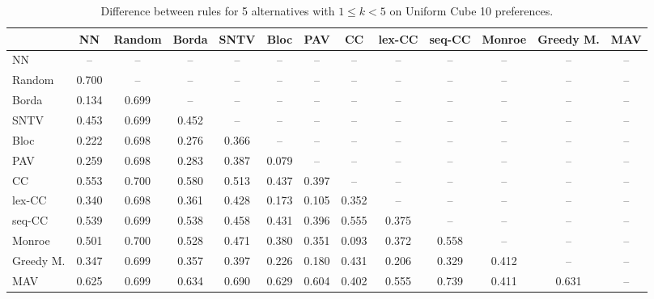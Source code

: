 
\begin{table*}[htbp]
\centering
\begin{tabular}{lcccccccccccc}
\toprule
 & NN & Random & Borda & SNTV & Bloc & PAV & CC & lex-CC & seq-CC & Monroe & Greedy M. & MAV \\
\midrule
NN & -- & -- & -- & -- & -- & -- & -- & -- & -- & -- & -- & -- \\
Random & \cellcolor{blue!70} 0.700 & -- & -- & -- & -- & -- & -- & -- & -- & -- & -- & -- \\
Borda & \cellcolor{blue!13} 0.134 & \cellcolor{blue!69} 0.699 & -- & -- & -- & -- & -- & -- & -- & -- & -- & -- \\
SNTV & \cellcolor{blue!45} 0.453 & \cellcolor{blue!69} 0.699 & \cellcolor{blue!45} 0.452 & -- & -- & -- & -- & -- & -- & -- & -- & -- \\
Bloc & \cellcolor{blue!22} 0.222 & \cellcolor{blue!69} 0.698 & \cellcolor{blue!27} 0.276 & \cellcolor{blue!36} 0.366 & -- & -- & -- & -- & -- & -- & -- & -- \\
PAV & \cellcolor{blue!25} 0.259 & \cellcolor{blue!69} 0.698 & \cellcolor{blue!28} 0.283 & \cellcolor{blue!38} 0.387 & \cellcolor{blue!7} 0.079 & -- & -- & -- & -- & -- & -- & -- \\
CC & \cellcolor{blue!55} 0.553 & \cellcolor{blue!70} 0.700 & \cellcolor{blue!57} 0.580 & \cellcolor{blue!51} 0.513 & \cellcolor{blue!43} 0.437 & \cellcolor{blue!39} 0.397 & -- & -- & -- & -- & -- & -- \\
lex-CC & \cellcolor{blue!34} 0.340 & \cellcolor{blue!69} 0.698 & \cellcolor{blue!36} 0.361 & \cellcolor{blue!42} 0.428 & \cellcolor{blue!17} 0.173 & \cellcolor{blue!10} 0.105 & \cellcolor{blue!35} 0.352 & -- & -- & -- & -- & -- \\
seq-CC & \cellcolor{blue!53} 0.539 & \cellcolor{blue!69} 0.699 & \cellcolor{blue!53} 0.538 & \cellcolor{blue!45} 0.458 & \cellcolor{blue!43} 0.431 & \cellcolor{blue!39} 0.396 & \cellcolor{blue!55} 0.555 & \cellcolor{blue!37} 0.375 & -- & -- & -- & -- \\
Monroe & \cellcolor{blue!50} 0.501 & \cellcolor{blue!70} 0.700 & \cellcolor{blue!52} 0.528 & \cellcolor{blue!47} 0.471 & \cellcolor{blue!38} 0.380 & \cellcolor{blue!35} 0.351 & \cellcolor{blue!9} 0.093 & \cellcolor{blue!37} 0.372 & \cellcolor{blue!55} 0.558 & -- & -- & -- \\
Greedy M. & \cellcolor{blue!34} 0.347 & \cellcolor{blue!69} 0.699 & \cellcolor{blue!35} 0.357 & \cellcolor{blue!39} 0.397 & \cellcolor{blue!22} 0.226 & \cellcolor{blue!18} 0.180 & \cellcolor{blue!43} 0.431 & \cellcolor{blue!20} 0.206 & \cellcolor{blue!32} 0.329 & \cellcolor{blue!41} 0.412 & -- & -- \\
MAV & \cellcolor{blue!62} 0.625 & \cellcolor{blue!69} 0.699 & \cellcolor{blue!63} 0.634 & \cellcolor{blue!69} 0.690 & \cellcolor{blue!62} 0.629 & \cellcolor{blue!60} 0.604 & \cellcolor{blue!40} 0.402 & \cellcolor{blue!55} 0.555 & \cellcolor{blue!73} 0.739 & \cellcolor{blue!41} 0.411 & \cellcolor{blue!63} 0.631 & -- \\
\bottomrule
\end{tabular}

\caption{Difference between rules for 5 alternatives with $1 \leq k < 5$ on Uniform Cube 10 preferences.}
\label{tab:rule_distance_heatmap-m=[5]-pref_dist=euclidean__args__dimensions=10_-_space=uniform_cube}
\end{table*}
    